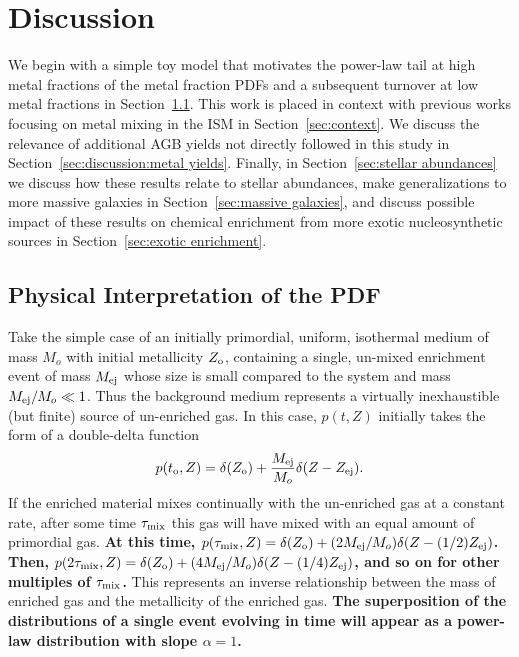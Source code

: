 \documentclass[twocolumn]{aastex61}
\begin{document}
\section{Discussion}
\label{sec:discussion}
We begin with a simple toy model that motivates the power-law tail at high metal fractions of the metal fraction PDFs and a subsequent turnover at low metal fractions in Section~\ref{sec:interpretation}. This work is placed in context with previous works focusing on metal mixing in the ISM in Section~\ref{sec:context}. We discuss the relevance of additional AGB yields not directly followed in this study in Section~\ref{sec:discussion:metal yields}. Finally, in Section~\ref{sec:stellar abundances} we discuss how these results relate to stellar abundances, make generalizations to more massive galaxies in Section~\ref{sec:massive galaxies}, and discuss possible impact of these results on chemical enrichment from more exotic nucleosynthetic sources in Section~\ref{sec:exotic enrichment}.

\subsection{Physical Interpretation of the PDF}
\label{sec:interpretation}
%
Take the simple case of an initially primordial, uniform, isothermal medium of mass $M_o$ with initial metallicity $Z_{\rm o}$, containing a single, un-mixed enrichment event of mass $M_{\rm ej}$ whose size is small compared to the system and mass $M_{\rm ej} / M_o \ll 1$. Thus the background medium represents a virtually inexhaustible (but finite) source of un-enriched gas. In this case, $p(t,Z)$ initially takes the form of a double-delta function
\begin{equation}
p(t_{\rm o},Z) = \delta(Z_{\rm o}) + \frac{M_{\rm ej}}{M_o}\delta(Z - Z_{\rm ej}).
\end{equation}
If the enriched material mixes continually with the un-enriched gas at a constant rate, after some time  $\tau_{\rm mix}$ this gas will have mixed with an equal amount of primordial gas. \textbf{At this time, $p(\tau_{\rm mix},Z) = \delta(Z_{\rm o}) + (2M_{\rm ej}/M_o) \delta(Z - (1/2)Z_{\rm ej})$. Then, $p(2\tau_{\rm mix},Z) = \delta(Z_{\rm o}) + (4M_{\rm ej}/M_o)\delta(Z - (1/4) Z_{\rm ej})$, and so on for other multiples of $\tau_{\rm mix}$.} This represents an inverse relationship between the mass of enriched gas and the metallicity of the enriched gas. \textbf{The superposition of the distributions of a single event evolving in time will appear as a power-law distribution with slope $\alpha = 1$.}
\end{document}
